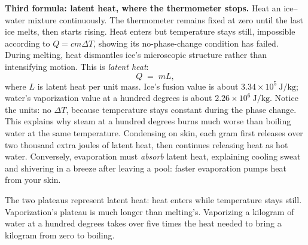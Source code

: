 \textbf{Third formula: latent heat, where the thermometer stops.} Heat an ice--water mixture continuously. The thermometer remains fixed at zero until the last ice melts, then starts rising. Heat enters but temperature stays still, impossible according to \(Q=cm\Delta T\), showing its no-phase-change condition has failed. During melting, heat dismantles ice's microscopic structure rather than intensifying motion. This is \emph{latent heat}:
\[
Q \;=\; mL,
\]
where \(L\) is latent heat per unit mass. Ice's fusion value is about \(3.34\times10^{5}\ \mathrm{J/kg}\); water's vaporization value at a hundred degrees is about \(2.26\times10^{6}\ \mathrm{J/kg}\). Notice the units: no \(\Delta T\), because temperature stays constant during the phase change. This explains why steam at a hundred degrees burns much worse than boiling water at the same temperature. Condensing on skin, each gram first releases over two thousand extra joules of latent heat, then continues releasing heat as hot water. Conversely, evaporation must \emph{absorb} latent heat, explaining cooling sweat and shivering in a breeze after leaving a pool: faster evaporation pumps heat from your skin.

\begin{center}
\end{center}

The two plateaus represent latent heat: heat enters while temperature stays still. Vaporization's plateau is much longer than melting's. Vaporizing a kilogram of water at a hundred degrees takes over five times the heat needed to bring a kilogram from zero to boiling.

